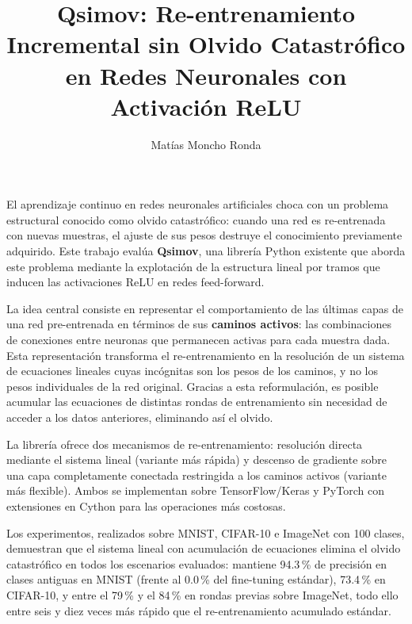 \documentclass[twoside,spanish,a4paper,12pt]{tfg}
\title{Qsimov: Re-entrenamiento Incremental sin Olvido Catastrófico en Redes Neuronales con Activación ReLU}
\author{Matías Moncho Ronda}
\begin{document}
\portada
\cleardoublepage
\contraportada
\cleardoublepage
\ia
\cleardoublepage

\begin{resumen}
El aprendizaje continuo en redes neuronales artificiales choca con un problema estructural conocido
como olvido catastrófico: cuando una red es re-entrenada con nuevas muestras, el ajuste de sus pesos
destruye el conocimiento previamente adquirido. Este trabajo evalúa \textbf{Qsimov}, una librería
Python existente que aborda este problema mediante la explotación de la estructura lineal por tramos
que inducen las activaciones ReLU en redes feed-forward.

La idea central consiste en representar el comportamiento de las últimas capas de una red
pre-entrenada en términos de sus \textbf{caminos activos}: las combinaciones de conexiones entre
neuronas que permanecen activas para cada muestra dada. Esta representación transforma el
re-entrenamiento en la resolución de un sistema de ecuaciones lineales cuyas incógnitas son los pesos
de los caminos, y no los pesos individuales de la red original. Gracias a esta reformulación, es
posible acumular las ecuaciones de distintas rondas de entrenamiento sin necesidad de acceder a los
datos anteriores, eliminando así el olvido.

La librería ofrece dos mecanismos de re-entrenamiento: resolución directa mediante el sistema lineal
(variante más rápida) y descenso de gradiente sobre una capa completamente conectada restringida a
los caminos activos (variante más flexible). Ambos se implementan sobre TensorFlow/Keras y PyTorch
con extensiones en Cython para las operaciones más costosas.

Los experimentos, realizados sobre MNIST, CIFAR-10 e ImageNet con 100 clases, demuestran que el
sistema lineal con acumulación de ecuaciones elimina el olvido catastrófico en todos los escenarios
evaluados: mantiene 94.3\,\% de precisión en clases antiguas en MNIST (frente al 0.0\,\% del
fine-tuning estándar), 73.4\,\% en CIFAR-10, y entre el 79\,\% y el 84\,\% en rondas previas sobre
ImageNet, todo ello entre seis y diez veces más rápido que el re-entrenamiento acumulado estándar.

\end{resumen}
\cleardoublepage
\end{document}
